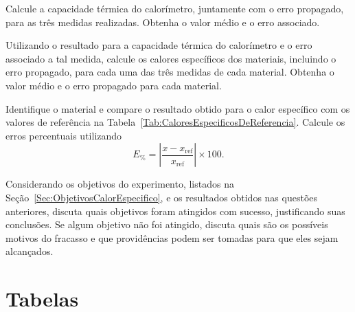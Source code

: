 \begin{question}[type={exam}]{2}
Calcule a capacidade térmica do calorímetro, juntamente com o erro propagado, para as três medidas realizadas. Obtenha o valor médio e o erro associado.
\end{question}

\begin{question}[type={exam}]{2}
Utilizando o resultado para a capacidade térmica do calorímetro e o erro associado a tal medida, calcule os calores específicos dos materiais, incluindo o erro propagado, para cada uma das três medidas de cada material. Obtenha o valor médio e o erro propagado para cada material.
\end{question}

\begin{question}[type={exam}]{1}
Identifique o material e compare o resultado obtido para o calor específico com os valores de referência na Tabela~\ref{Tab:CaloresEspecificosDeReferencia}. Calcule os erros percentuais utilizando
\begin{equation}
	E_{\%} = \left|\frac{x-x_{\text{ref}}}{x_{\text{ref}}}\right| \times 100.
\end{equation}
\end{question}

\begin{question}[type={exam}]{1.5}
Considerando os objetivos do experimento, listados na Seção~\ref{Sec:ObjetivosCalorEspecifico}, e os resultados obtidos nas questões anteriores, discuta quais objetivos foram atingidos com sucesso, justificando suas conclusões. Se algum objetivo não foi atingido, discuta quais são os possíveis motivos do fracasso e que providências podem ser tomadas para que eles sejam alcançados.
\end{question}

\vfill
\pagebreak
\section{Tabelas}

